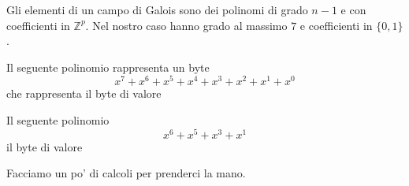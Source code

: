 \documentclass[12pt]{report}
\begin{document}
    \begin{center}

    \end{center}
    Gli elementi di un campo di Galois sono dei polinomi di grado $n-1$ e con coefficienti in $\mathbb{Z}^p$. Nel nostro caso hanno grado al massimo $7$ e coefficienti in $\{0,1\}$.

    \begin{exmp}
        Il seguente polinomio rappresenta un byte
        $$x^7 + x^6 + x^5 + x^4 + x^3 + x^2 + x^1 + x^0$$
        che rappresenta il byte di valore
        \begin{center}
        \end{center}
    \end{exmp}

    \begin{exmp}
        Il seguente polinomio
        $$x^6 + x^5 + x^3 + x^1$$
        il byte di valore
        \begin{center}
        \end{center}
    \end{exmp}

    \noindent
    Facciamo un po' di calcoli per prenderci la mano.
\end{document}
